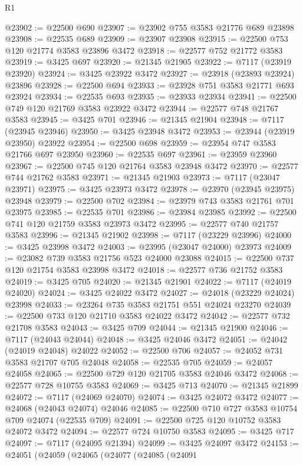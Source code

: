\begin{lexlean}{R1}
\begin{coremodule}
@23902 := @22500 @690
@23907 := @23902 @755 @3583 @21776 @689 @23898
@23908 := @22535 @689
@23909 := @23907 @23908
@23915 := @22500 @753 @120 @21774 @3583 @23896 @3472
@23918 := @22577 @752 @21772 @3583
@23919 := @3425 @697
@23920 := @21345 @21905
@23922 := @7117 (@23919 @23920)
@23924 := @3425 @23922 @3472
@23927 := @23918 (@23893 @23924) @23896
@23928 := @22500 @694
@23933 := @23928 @751 @3583 @21771 @693 @23924
@23934 := @22535 @693
@23935 := @23933 @23934
@23941 := @22500 @749 @120 @21769 @3583 @23922 @3472
@23944 := @22577 @748 @21767 @3583
@23945 := @3425 @701
@23946 := @21345 @21904
@23948 := @7117 (@23945 @23946)
@23950 := @3425 @23948 @3472
@23953 := @23944 (@23919 @23950) @23922
@23954 := @22500 @698
@23959 := @23954 @747 @3583 @21766 @697 @23950
@23960 := @22535 @697
@23961 := @23959 @23960
@23967 := @22500 @745 @120 @21764 @3583 @23948 @3472
@23970 := @22577 @744 @21762 @3583
@23971 := @21345 @21903
@23973 := @7117 (@23047 @23971)
@23975 := @3425 @23973 @3472
@23978 := @23970 (@23945 @23975) @23948
@23979 := @22500 @702
@23984 := @23979 @743 @3583 @21761 @701 @23975
@23985 := @22535 @701
@23986 := @23984 @23985
@23992 := @22500 @741 @120 @21759 @3583 @23973 @3472
@23995 := @22577 @740 @21757 @3583
@23996 := @21345 @21902
@23998 := @7117 (@23229 @23996)
@24000 := @3425 @23998 @3472
@24003 := @23995 (@23047 @24000) @23973
@24009 := @23082 @739 @3583 @21756 @523 @24000 @23088
@24015 := @22500 @737 @120 @21754 @3583 @23998 @3472
@24018 := @22577 @736 @21752 @3583
@24019 := @3425 @705
@24020 := @21345 @21901
@24022 := @7117 (@24019 @24020)
@24024 := @3425 @24022 @3472
@24027 := @24018 (@23229 @24024) @23998
@24033 := @23264 @735 @3583 @21751 @551 @24024 @23270
@24039 := @22500 @733 @120 @21710 @3583 @24022 @3472
@24042 := @22577 @732 @21708 @3583
@24043 := @3425 @709
@24044 := @21345 @21900
@24046 := @7117 (@24043 @24044)
@24048 := @3425 @24046 @3472
@24051 := @24042 (@24019 @24048) @24022
@24052 := @22500 @706
@24057 := @24052 @731 @3583 @21707 @705 @24048
@24058 := @22535 @705
@24059 := @24057 @24058
@24065 := @22500 @729 @120 @21705 @3583 @24046 @3472
@24068 := @22577 @728 @10755 @3583
@24069 := @3425 @713
@24070 := @21345 @21899
@24072 := @7117 (@24069 @24070)
@24074 := @3425 @24072 @3472
@24077 := @24068 (@24043 @24074) @24046
@24085 := @22500 @710 @727 @3583 @10754 @709 @24074 (@22535 @709)
@24091 := @22500 @725 @120 @10752 @3583 @24072 @3472
@24094 := @22577 @724 @10750 @3583
@24095 := @3425 @717
@24097 := @7117 (@24095 @21394)
@24099 := @3425 @24097 @3472
@24153 := @24051
    (@24059
      (@24065
        (@24077
          (@24085
            (@24091

\end{coremodule}
\end{lexlean}
